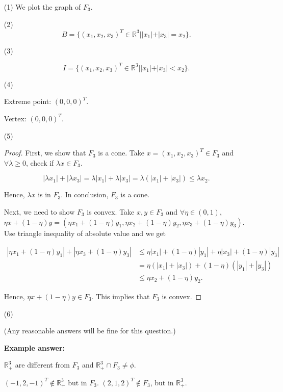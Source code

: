 \documentclass[12pt]{article}
\begin{document}
\begin{enumerate}
\item [(1)]
We plot the graph of $F_3$.


\item [(2)]
$$
B = \{(x_1, x_2, x_3)^T \in \mathbb R^3 | |x_1| + |x_3| = x_2 \}.
$$



\item [(3)]

$$
I = \{(x_1, x_2, x_3)^T \in \mathbb R^3 | |x_1| + |x_3| < x_2 \}.
$$


\item [(4)]

Extreme point: $(0, 0, 0)^T$.

Vertex: $(0, 0, 0)^T$.

\item [(5)]
\begin{proof}

First, we show that $F_3$ is a cone. Take $x = (x_1, x_2, x_3)^T \in F_3$ and $\forall \lambda \geqslant 0$, check if $\lambda x \in F_3$. 

$$
|\lambda x_1| + |\lambda x_3| = \lambda |x_1| + \lambda |x_3| = \lambda (|x_1| + |x_3|) \leqslant \lambda x_2.
$$

Hence, $\lambda x$ is in $F_3$. In conclusion, $F_3$ is a cone.

Next, we need to show $F_3$ is convex. Take $x, y \in F_3$ and $\forall \eta \in (0, 1)$, $\eta x + (1- \eta) y = (\eta x_1 + (1-\eta)y_1, \eta x_2 + (1-\eta)y_2, \eta x_3 + (1-\eta)y_3)$. Use triangle inequality of absolute value and we get

$$
\begin{aligned}
|\eta x_1 + (1-\eta)y_1| + |\eta x_3 + (1-\eta)y_3| & \leqslant \eta |x_1| + (1-\eta)|y_1| + \eta |x_3| + (1-\eta)|y_3| \\
& = \eta (|x_1|+|x_3|) + (1-\eta)(|y_1|+|y_3|) \\
& \leqslant \eta x_2 + (1-\eta) y_2.
\end{aligned}
$$

Hence, $\eta x + (1- \eta) y \in F_3$. This implies that $F_3$ is convex.

\end{proof}

\item [(6)]

(Any reasonable answers will be fine for this question.)

\textbf{Example answer:}

$\mathbb R_+^3$ are different from $F_3$ and $\mathbb R_+^3 \cap F_3 \neq \phi$. 

$(-1, 2, -1)^T \notin \mathbb R_+^3$ but in $F_3$. $(2,1,2)^T \notin F_3$, but in $\mathbb R_+^3$.

\end{enumerate}
\end{document}
